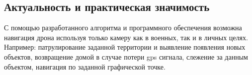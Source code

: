     \subsection*{Актуальность и практическая значимость}
    
    \tab С помощью разработанного алгоритма и программного обеспечения возможна навигация дрона используя только камеру как в военных, так и в личных целях. Например: патрулирование заданной территории и выявление появления новых объектов, возвращение домой в случае потери gps сигнала, слежение за данным объектом, навигация по заданной графической точке.
\newpage